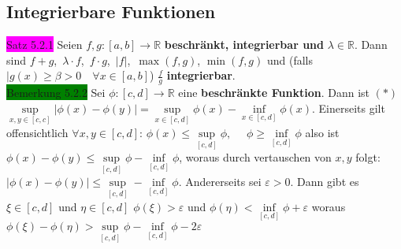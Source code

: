 \documentclass[landscape, 10pt]{article}
\newcommand{\R}{\mathbb{R}}
\begin{document}
\begin{multicols}{3}
       \subsection{Integrierbare Funktionen}
              \colorbox{magenta}{Satz 5.2.1} 
                     Seien \textcolor{NavyBlue}{$f,g:[a,b]\longrightarrow\R$} 
                     \textbf{beschränkt, integrierbar und} 
                     \textcolor{NavyBlue}{$\lambda\in\R$}. 
                     Dann sind \textcolor{NavyBlue}{$f+g$},\,
                     \textcolor{NavyBlue}{$\lambda\cdot f$},\,
                     \textcolor{NavyBlue}{$f\cdot g$},\,
                     \textcolor{NavyBlue}{$|f|$},\,
                     \textcolor{NavyBlue}{$\max(f,g)$},
                     \textcolor{NavyBlue}{$\min(f,g)$} und (falls 
                     \textcolor{NavyBlue}{
                     $|g(x)\geqslant\beta>0\quad\forall x\in[a,b]$})
                     \textcolor{NavyBlue}{$\frac{f}{g}$}
                     \textbf{integrierbar}.\\
              \colorbox{green}{Bemerkung 5.2.2} 
                     Sei \textcolor{NavyBlue}{$\phi:[c,d]\longrightarrow\R$} 
                     eine \textbf{beschränkte Funktion}. Dann ist 
                     $(*)$\textcolor{NavyBlue}{$\sup\limits_{x,y\in[c,c]}|\phi(x)-\phi(y)|
                     =\sup\limits_{x\in[c,d]}\phi(x)-\inf\limits_{x\in[c,d]}\phi(x)$}.
                     Einerseits gilt offensichtlich 
                     \textcolor{NavyBlue}{$\forall x,y\in[c,d]$}: 
                     \textcolor{NavyBlue}{$\phi(x)\leqslant\sup\limits_{[c,d]}\phi,$}
                     \textcolor{NavyBlue}{$\quad\phi\geqslant\inf\limits_{[c,d]}\phi$}
                     also ist \textcolor{NavyBlue}{
                     $\phi(x)-\phi(y)\leqslant\sup\limits_{[c,d]}\phi-\inf\limits_{[c,d]}\phi$}, 
                     woraus durch vertauschen von \textcolor{NavyBlue}{$x,y$} folgt: 
                     \textcolor{NavyBlue}{
                     $|\phi(x)-\phi(y)|\leqslant\sup\limits_{[c,d]}-\inf\limits_{[c,d]}\phi$}. 
                     Andererseits sei \textcolor{NavyBlue}{$\varepsilon>0$}. 
                     Dann gibt es \textcolor{NavyBlue}{$\xi\in[c,d]$}
                     und \textcolor{NavyBlue}{$\eta\in[c,d]$ $\phi(\xi)>\varepsilon$} und 
                     \textcolor{NavyBlue}{$\phi(\eta)<\inf\limits_{[c,d]}\phi+\varepsilon$} 
                     woraus 
                     \textcolor{NavyBlue}{$\phi(\xi)-\phi(\eta)
                     >\sup\limits_{[c,d]}\phi-\inf\limits_{[c,d]}\phi-2\varepsilon$}

\end{multicols}
\end{document}
